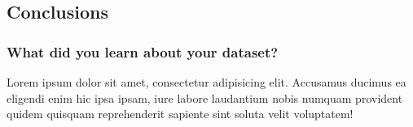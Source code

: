 \subsection{Conclusions}

\subsubsection{What did you learn about your dataset?}

Lorem ipsum dolor sit amet, consectetur adipisicing elit. Accusamus ducimus ea eligendi enim hic ipsa ipsam, iure labore laudantium nobis numquam provident quidem quisquam reprehenderit sapiente sint soluta velit voluptatem!
